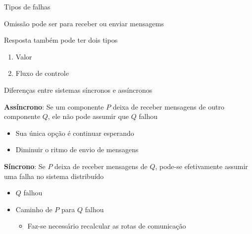 \documentclass[compress]{beamer}
\begin{document}
\begin{frame}{Tipos de falhas}

\begin{table}[]
\centering
\label{tab:my-table11}
\end{table}

Omissão pode ser para receber ou enviar mensagems

\vspace{0.25cm}

Resposta também pode ter dois tipos
\begin{enumerate}
    \item Valor
    \item Fluxo de controle
\end{enumerate}
\end{frame}


\begin{frame}{Diferenças entre sistemas síncronos e assíncronos}

\textbf{Assíncrono}: Se um componente $P$ deixa de receber mensagens de outro componente $Q$, ele não pode assumir que $Q$ falhou
\begin{itemize}
    \item Sua única opção é continuar esperando
    \item Diminuir o ritmo de envio de mensagens
\end{itemize}

\vspace{0.5cm}

\textbf{Síncrono}: Se $P$ deixa de receber mensagens de $Q$, pode-se efetivamente assumir uma falha no sistema distribuído
\begin{itemize}
    \item $Q$ falhou
    \item Caminho de $P$ para $Q$ falhou
    \begin{itemize}
        \item Faz-se necessário recalcular as rotas de comunicação
    \end{itemize}
\end{itemize}
\end{frame}
\end{document}
